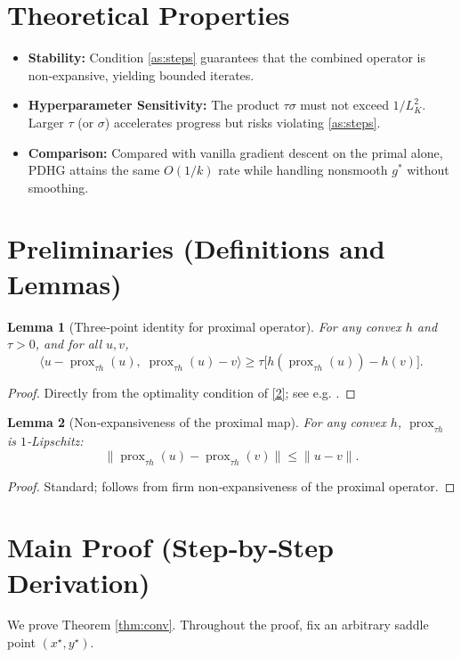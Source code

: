 \documentclass{article}
\newtheorem{lemma}{Lemma}
\begin{document}
\section*{Theoretical Properties}
\begin{itemize}
  \item \textbf{Stability:} Condition \eqref{as:steps} guarantees that the combined operator is non‑expansive, yielding bounded iterates.
  \item \textbf{Hyperparameter Sensitivity:} The product $\tau\sigma$ must not exceed $1/L_K^{2}$. Larger $\tau$ (or $\sigma$) accelerates progress but risks violating \eqref{as:steps}.
  \item \textbf{Comparison:} Compared with vanilla gradient descent on the primal alone, PDHG attains the same $O(1/k)$ rate while handling nonsmooth $g^{*}$ without smoothing.
\end{itemize}

\section*{Preliminaries (Definitions and Lemmas)}
\begin{lemma}[Three‑point identity for proximal operator]
\label{lem:three}
For any convex $h$ and $\tau>0$, and for all $u,v$,
\[
\langle u-\operatorname{prox}_{\tau h}(u),\; \operatorname{prox}_{\tau h}(u)-v\rangle
\ge \tau\bigl[h(\operatorname{prox}_{\tau h}(u))-h(v)\bigr].
\tag{6}
\]
\end{lemma}
\begin{proof}
Directly from the optimality condition of \eqref{2}; see e.g. \cite{Bauschke2011}.
\end{proof}
\begin{lemma}[Non‑expansiveness of the proximal map]
\label{lem:nonexp}
For any convex $h$, $\operatorname{prox}_{\tau h}$ is $1$‑Lipschitz:
\[
\bigl\|\operatorname{prox}_{\tau h}(u)-\operatorname{prox}_{\tau h}(v)\bigr\|\le \|u-v\|.
\tag{7}
\]
\end{lemma}
\begin{proof}
Standard; follows from firm non‑expansiveness of the proximal operator.
\end{proof}

\section*{Main Proof (Step‑by‑Step Derivation)}
We prove Theorem \ref{thm:conv}.  Throughout the proof, fix an arbitrary saddle point $(x^{\star},y^{\star})$.
\end{document}
